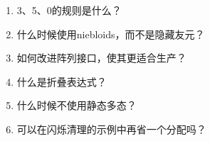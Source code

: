 \begin{enumerate}
\item
3、5、0的规则是什么？

\item
什么时候使用niebloids，而不是隐藏友元？

\item
如何改进阵列接口，使其更适合生产？

\item
什么是折叠表达式？

\item
什么时候不使用静态多态？

\item
可以在闪烁清理的示例中再省一个分配吗？
\end{enumerate}